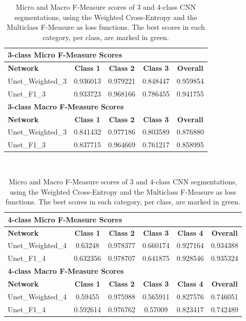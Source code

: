 \begin {table}
	\begin{flushleft}
		\begin {tabular}[!ht]{|l|c|c|c|c|}
			\hline\multicolumn{5}{|l|}{\textbf{3-class Micro F-Measure Scores}} \\ \hline
			\textbf{Network}& \textbf{Class 1}& \textbf{Class 2}& \textbf{Class 3}& \textbf{Overall} \\ \hline
			Unet\_Weighted\_3& \cellcolor{green!25}0.936013& \cellcolor{green!25}0.979221& \cellcolor{green!25}0.848447& \cellcolor{green!25}0.959854 \\ \hline
			Unet\_F1\_3& 0.933723& 0.968166& 0.786455&  0.941755\\ \hline
			\multicolumn{5}{|l|}{\textbf{3-class Macro F-Measure Scores}} \\ \hline
			\textbf{Network}& \textbf{Class 1}& \textbf{Class 2}& \textbf{Class 3}& \textbf{Overall} \\ \hline
			Unet\_Weighted\_3& \cellcolor{green!25}0.841432& \cellcolor{green!25}0.977186& \cellcolor{green!25}0.803589& \cellcolor{green!25}0.876880 \\ \hline
			Unet\_F1\_3& 0.837715& 0.964669& 0.761217& 0.858995 \\ \hline
		\end {tabular}
		\vspace{0.5cm}\\
		\begin {tabular}[!ht]{|l|c|c|c|c|c|}
			\hline\multicolumn{6}{|l|}{\textbf{4-class Micro F-Measure Scores}} \\ \hline
			\textbf{Network}& \textbf{Class 1}& \textbf{Class 2}& \textbf{Class 3}& \textbf{Class 4}& \textbf{Overall} \\ \hline
			Unet\_Weighted\_4& \cellcolor{green!25}0.63248& 0.978377& \cellcolor{green!25}0.660174& 0.927164& 0.934388 \\ \hline
			Unet\_F1\_4& 0.632356& \cellcolor{green!25}0.978707& 0.641875& \cellcolor{green!25}0.928546& \cellcolor{green!25}0.935324 \\ \hline
			\multicolumn{6}{|l|}{\textbf{4-class Macro F-Measure Scores}} \\ \hline
			\textbf{Network}& \textbf{Class 1}& \textbf{Class 2}& \textbf{Class 3}& \textbf{Class 4}& \textbf{Overall} \\ \hline
			Unet\_Weighted\_4& \cellcolor{green!25}0.59455& 0.975988& 0.565911& \cellcolor{green!25}0.827576& \cellcolor{green!25}0.746051 \\ \hline
			Unet\_F1\_4& 0.592614& \cellcolor{green!25}0.976762& \cellcolor{green!25}0.57009& 0.823417& 0.742489 \\ \hline
		\end {tabular}
	\end {flushleft}

\caption[]{Micro and Macro F-Measure scores of 3 and 4-class CNN segmentations, using the Weighted Cross-Entropy and the Multiclass F-Measure as loss functions. The best scores in each category, per class, are marked in green.}
\end {table}

